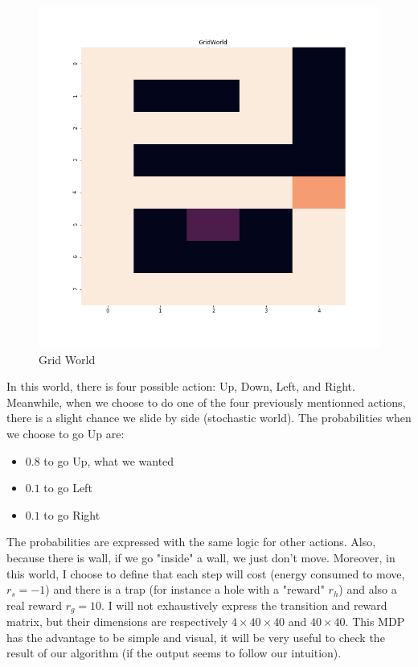 \documentclass[11pt]{article}
\begin{document}
\begin{multicols}{2}
\begin{figure}[H]
\centering
\includegraphics[width = \columnwidth]{gw.png}
\caption{Grid World}
\end{figure}

In this world, there is four possible action: Up, Down, Left, and Right. Meanwhile, when we choose to do one of the four previously mentionned actions, there is a slight chance we slide by side (stochastic world). The probabilities when we choose to go Up are:
\begin{itemize}
\item $0.8$ to go Up, what we wanted
\item $0.1$ to go Left
\item $0.1$ to go Right
\end{itemize}
The probabilities are expressed with the same logic for other actions. Also, because there is wall, if we go "inside" a wall, we just don't move. Moreover, in this world, I choose to define that each step will cost (energy consumed to move, $r_s = -1$) and there is a trap (for instance a hole with a "reward" $r_h$) and also a real reward $r_g =10$. I will not exhaustively express the transition and reward matrix, but their dimensions are respectively $4\times 40 \times 40$ and $40\times 40$. This MDP has the advantage to be simple and visual, it will be very useful to check the result of our algorithm (if the output seems to follow our intuition).


\end{multicols}
\end{document}
